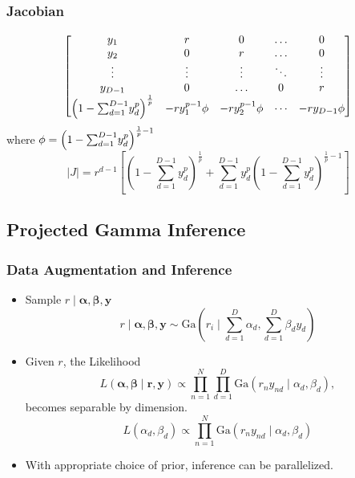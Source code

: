\documentclass[aspectratio=169,10pt]{beamer}
\begin{document}
\begin{frame}
  \frametitle{Jacobian}
  \label{pgpareto:jacobian}
  \begin{equation*}
    \begin{bmatrix}
      y_1 & r & 0 & \ldots & 0\\
      y_2 & 0 & r & \ldots & 0\\
      \vdots & \vdots & \vdots & \ddots & \vdots\\
      y_{D-1} & 0 & \ldots & 0 & r \\
      \left(1 - {\scriptsize\sum_{d=1}^{D-1}}y_d^p\right)^{\frac{1}{p}} &
        - ry_1^{p-1}\phi & -ry_2^{p-1}\phi & \cdots & -ry_{D-1}\phi
    \end{bmatrix}
  \end{equation*}
  where $\phi = \left(1 - {\scriptsize\sum_{d=1}^{D-1}}y_d^p\right)^{\frac{1}{p} - 1}$
  \begin{equation*}
  \lvert J \rvert = r^{d-1}\left[\left(1 - {\textstyle\sum}_{d = 1}^{D-1}y_d^p\right)^{\frac{1}{p}} +
      {\textstyle\sum}_{d = 1}^{D-1}y_d^p\left(1 - {\textstyle\sum}_{d=1}^{D-1}
          y_d^p\right)^{\frac{1}{p} - 1}\right]
  \end{equation*}
\end{frame} %

\subsection*{Projected Gamma Inference}

\begin{frame}
    \frametitle{Data Augmentation and Inference}
    \label{pgpareto:projgammainference}
    {\small 
    \begin{itemize}
        \item Sample $r\mid\bm{\alpha},\bm{\beta},\bm{y}$
        \[
            r\mid\bm{\alpha},\bm{\beta},\bm{y} \sim 
                \text{Ga}\left(r_i\mid \sum_{d = 1}^D \alpha_d, 
                    \sum_{d = 1}^D\beta_dy_d\right)
        \]
        \item Given $r$, the Likelihood
        \[
        L(\bm{\alpha},\bm{\beta}\mid \bm{r},\bm{y}) 
            \propto \prod_{n = 1}^N\prod_{d = 1}^D
            \text{Ga}\left(r_ny_{nd}\mid\alpha_d,\beta_d\right),
        \]
        becomes separable by dimension.
        \[
        L(\alpha_d,\beta_d) \propto 
            \prod_{n = 1}^N\text{Ga}\left(r_ny_{nd}\mid\alpha_d,\beta_d\right)
        \]
        \item With appropriate choice of prior, inference can be parallelized.
    \end{itemize}
    }
    \hyperlink{pgpareto:projectedgamma}{}
\end{frame} %
\end{document}
